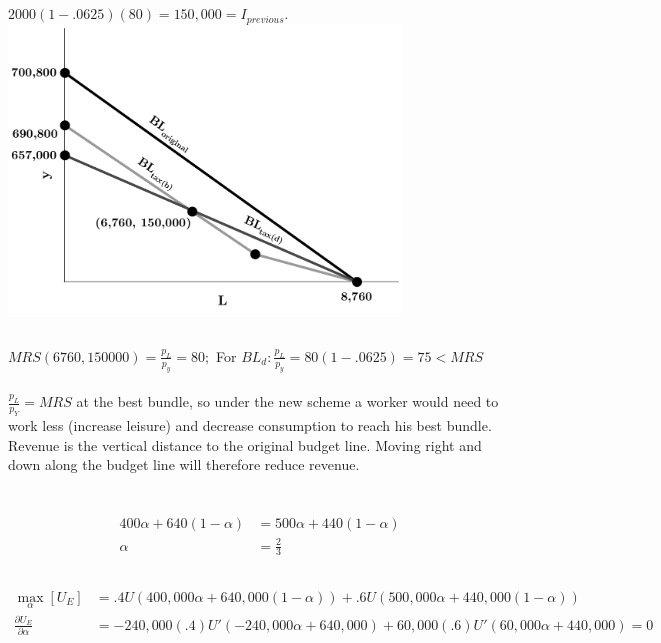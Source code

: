 \documentclass{article}
\begin{document}
	\subsection[d]{}
		$ 2000(1-.0625)(80) = 150,000 = I_{previous} $. \\
		\includegraphics[height=3in]{Charts/1d}
	\subsection[e]{}
		$ MRS(6760, 150000) = \frac{p_L}{p_y} = 80;$ For $BL_d: \frac{p_L}{p_y} = 80(1-.0625)=75<MRS$ \\ \\
		$\frac{p_L}{p_Y} = MRS $ at the best bundle, so under the new scheme a worker would need to work less (increase leisure) and decrease consumption to reach his best bundle. Revenue is the vertical distance to the original budget line. Moving right and down along the budget line will therefore reduce revenue. 
		
\section[2]{}
	\subsection[a]{}
		\begin{align*}
			400 \alpha + 640 (1-\alpha) &=500 \alpha + 440(1-\alpha)\\
			\alpha &= \frac{2}{3} 
		\end{align*}
	\subsection[b]{}
		\begin{align}
			\max_\alpha [U_E] &= .4U(400,000\alpha + 640,000(1-\alpha))+.6U(500,000\alpha+440,000(1-\alpha)) \\
			\frac{\partial U_E}{\partial \alpha} &=-240,000 (.4)U'(-240,000\alpha+640,000)+60,000(.6)U'(60,000\alpha + 440,000)=0
		\end{align}
\end{document}
